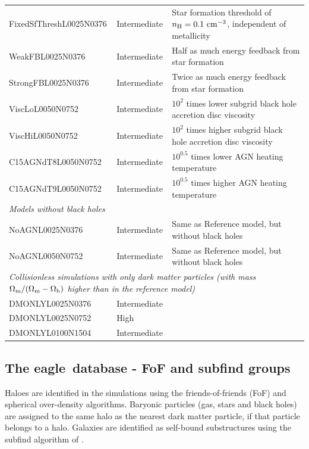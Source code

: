 \documentclass[10pt, a4paper]{article}
\newcommand{\eagle}{{\sc eagle}}
\begin{document}
\begin{table}
\begin{center}
\begin{tabular}{lll}
{\sc FixedSfThresh}L0025N0376 & Intermediate &Star
formation threshold of $n_{\rm H} = 0.1~{\rm cm}^{-3}$, independent of
metallicity\\
{\sc WeakFB}L0025N0376 & Intermediate & Half as much energy feedback
from star formation \\
{\sc StrongFB}L0025N0376 & Intermediate &Twice as much energy
feedback from star formation\\
{\sc ViscLo}L0050N0752 & Intermediate &$10^2$ times
lower subgrid black hole accretion disc viscosity\\
{\sc ViscHi}L0050N0752 &
Intermediate &$10^2$ times higher subgrid black hole accretion disc viscosity\\
{\sc C15AGNdT8}L0050N0752 & Intermediate &$10^{0.5}$ times lower AGN heating
temperature \\
{\sc C15AGNdT9}L0050N0752 & Intermediate & $10^{0.5}$ times higher AGN
heating temperature\\ \hline
\multicolumn{3}{l}{\emph{Models without black holes}}\\
\hline
{\sc NoAGN}L0025N0376 & Intermediate & Same as Reference model, but without black holes\\
{\sc NoAGN}L0050N0752 & Intermediate & Same as Reference model, but without black holes\\
\hline
\multicolumn{3}{l}{\emph{Collisionless simulations with only dark matter
  particles (with mass $\Omega_{\rm m} / (\Omega_{\rm m} - \Omega_{\rm
  b})$ higher than in the reference model)}}\\
\hline
{\sc DMONLY}L0025N0376 & Intermediate\\
{\sc DMONLY}L0025N0752 & High\\
{\sc DMONLY}L0100N1504 & Intermediate\\
\hline

\end{tabular}
\end{center}
\end{table}

\subsection{The \eagle\ database - FoF and {\sc subfind} groups}
Haloes are identified in the simulations using the friends-of-friends (FoF) and
spherical over-density algorithms.  Baryonic particles (gas, stars and black
holes) are assigned to the same halo as the nearest dark matter particle, if
that particle belongs to a halo. Galaxies are identified as self-bound
substructures using the {\sc subfind} algorithm of \cite{springel01,dolag09}.
	
\end{document}
